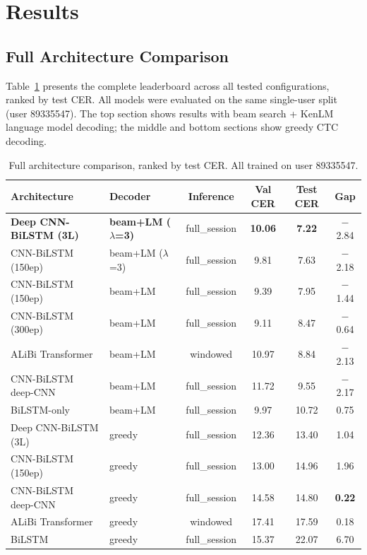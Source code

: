 \documentclass{article}
\begin{document}
\section{Results}

\subsection{Full Architecture Comparison}

Table~\ref{tab:full-results} presents the complete leaderboard across all tested configurations, ranked by test CER. All models were evaluated on the same single-user split (user 89335547). The top section shows results with beam search + KenLM language model decoding; the middle and bottom sections show greedy CTC decoding.

\begin{table}[h]
\centering
\small
\caption{Full architecture comparison, ranked by test CER. All trained on user 89335547.}
\label{tab:full-results}
\begin{tabular}{llcccc}
\toprule
\textbf{Architecture} & \textbf{Decoder} & \textbf{Inference} & \textbf{Val CER} & \textbf{Test CER} & \textbf{Gap} \\
\midrule
\textbf{Deep CNN-BiLSTM (3L)} & \textbf{beam+LM ($\lambda$=3)} & full\_session & \textbf{10.06} & \textbf{7.22} & $-$2.84 \\
CNN-BiLSTM (150ep) & beam+LM ($\lambda$=3) & full\_session & 9.81 & 7.63 & $-$2.18 \\
CNN-BiLSTM (150ep) & beam+LM & full\_session & 9.39 & 7.95 & $-$1.44 \\
CNN-BiLSTM (300ep) & beam+LM & full\_session & 9.11 & 8.47 & $-$0.64 \\
ALiBi Transformer & beam+LM & windowed & 10.97 & 8.84 & $-$2.13 \\
CNN-BiLSTM deep-CNN & beam+LM & full\_session & 11.72 & 9.55 & $-$2.17 \\
BiLSTM-only & beam+LM & full\_session & 9.97 & 10.72 & 0.75 \\
\midrule
Deep CNN-BiLSTM (3L) & greedy & full\_session & 12.36 & 13.40 & 1.04 \\
CNN-BiLSTM (150ep) & greedy & full\_session & 13.00 & 14.96 & 1.96 \\
CNN-BiLSTM deep-CNN & greedy & full\_session & 14.58 & 14.80 & \textbf{0.22} \\
ALiBi Transformer & greedy & windowed & 17.41 & 17.59 & 0.18 \\
BiLSTM & greedy & full\_session & 15.37 & 22.07 & 6.70 \\

\end{tabular}
\end{table}
\end{document}
